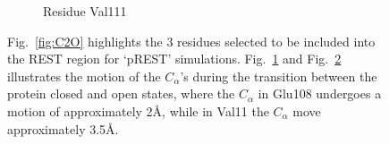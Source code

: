 \documentclass[journal=jctcce,manuscript=article]{achemso}
\begin{document}
\begin{figure}[!ht]
\begin{subfigure}{.45\textwidth}
   \label{fig:Glu108-C2O}
\end{subfigure}\hfill
\begin{subfigure}{.55\textwidth}
   \centering
   \caption{Residue Val111}
   \label{fig:Val111-C2O}
\end{subfigure}\hfill
\caption{Fig.~\ref{fig:C2O} highlights the 3 residues selected to be included into the REST region for `pREST' simulations. 
Fig.~\ref{fig:Glu108-C2O} and Fig.~\ref{fig:Val111-C2O} illustrates the motion of the $C_{\alpha}$'s during the transition between the protein closed and open states, where the $C_{\alpha}$ in Glu108 undergoes a motion of approximately 2\AA, while in Val11 the $C_{\alpha}$ move approximately 3.5\AA.}
\label{fig:pRESTresidues}
\end{figure}
\end{document}
